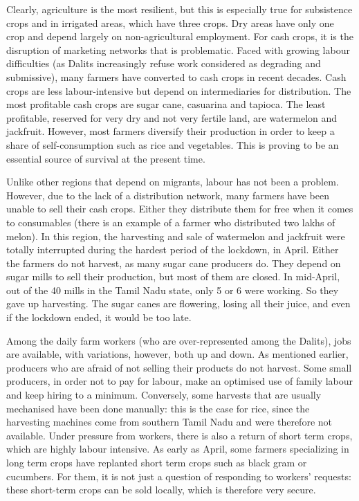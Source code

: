 \documentclass[a4paper, 11pt, onecolumn]{article}
\begin{document}
Clearly, agriculture is the most resilient, but this is especially true for subsistence crops and in irrigated areas, which have three crops.
Dry areas have only one crop and depend largely on non-agricultural employment. 
For cash crops, it is the disruption of marketing networks that is problematic. 
Faced with growing labour difficulties (as Dalits increasingly refuse work considered as degrading and submissive), many farmers have converted to cash crops in recent decades. 
Cash crops are less labour-intensive but depend on intermediaries for distribution. 
The most profitable cash crops are sugar cane, casuarina and tapioca. 
The least profitable, reserved for very dry and not very fertile land, are watermelon and jackfruit. 
However, most farmers diversify their production in order to keep a share of self-consumption such as rice and vegetables. 
This is proving to be an essential source of survival at the present time.

Unlike other regions that depend on migrants, labour has not been a problem. 
However, due to the lack of a distribution network, many farmers have been unable to sell their cash crops. 
Either they distribute them for free when it comes to consumables (there is an example of a farmer who distributed two lakhs of melon). 
In this region, the harvesting and sale of watermelon and jackfruit were totally interrupted during the hardest period of the lockdown, in April. 
Either the farmers do not harvest, as many sugar cane producers do. 
They depend on sugar mills to sell their production, but most of them are closed. 
In mid-April, out of the 40 mills in the Tamil Nadu state, only 5 or 6 were working. 
So they gave up harvesting. 
The sugar canes are flowering, losing all their juice, and even if the lockdown ended, it would be too late. 

Among the daily farm workers (who are over-represented among the Dalits), jobs are available, with variations, however, both up and down. 
As mentioned earlier, producers who are afraid of not selling their products do not harvest. 
Some small producers, in order not to pay for labour, make an optimised use of family labour and keep hiring to a minimum. 
Conversely, some harvests that are usually mechanised have been done manually: this is the case for rice, since the harvesting machines come from southern Tamil Nadu and were therefore not available. 
Under pressure from workers, there is also a return of short term crops, which are highly labour intensive. 
As early as April, some farmers specializing in long term crops have replanted short term crops such as black gram or cucumbers. 
For them, it is not just a question of responding to workers' requests: these short-term crops can be sold locally, which is therefore very secure. 
\end{document}
